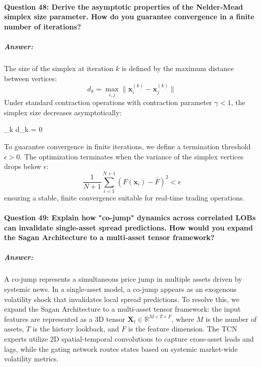 \documentclass[11pt,a4paper]{article}
\begin{document}
\paragraph{Question 48: Derive the asymptotic properties of the Nelder-Mead simplex size parameter. How do you guarantee convergence in a finite number of iterations?}
\subparagraph{Answer:}
The size of the simplex at iteration $k$ is defined by the maximum distance between vertices:
\begin{equation}
    d_k = \max_{i, j} \| \mathbf{x}_i^{(k)} - \mathbf{x}_j^{(k)} \|
\end{equation}
Under standard contraction operations with contraction parameter $\gamma < 1$, the simplex size decreases asymptotically:
\begin{equation{}}
    \lim_{k \to \infty} d_k = 0
\end{equation{}}
To guarantee convergence in finite iterations, we define a termination threshold $\epsilon > 0$. The optimization terminates when the variance of the simplex vertices drops below $\epsilon$:
\begin{equation}
    \frac{1}{N+1} \sum_{i=1}^{N+1} \left( F(\mathbf{x}_i) - \bar{F} \right)^2 < \epsilon
\end{equation}
ensuring a stable, finite convergence suitable for real-time trading operations.

\paragraph{Question 49: Explain how "co-jump" dynamics across correlated LOBs can invalidate single-asset spread predictions. How would you expand the Sagan Architecture to a multi-asset tensor framework?}
\subparagraph{Answer:}
A co-jump represents a simultaneous price jump in multiple assets driven by systemic news. In a single-asset model, a co-jump appears as an exogenous volatility shock that invalidates local spread predictions. To resolve this, we expand the Sagan Architecture to a multi-asset tensor framework: the input features are represented as a 3D tensor $\mathbf{X}_t \in \mathbb{R}^{M \times T \times F}$, where $M$ is the number of assets, $T$ is the history lookback, and $F$ is the feature dimension. The TCN experts utilize 2D spatial-temporal convolutions to capture cross-asset leads and lags, while the gating network routes states based on systemic market-wide volatility metrics.
\end{document}
